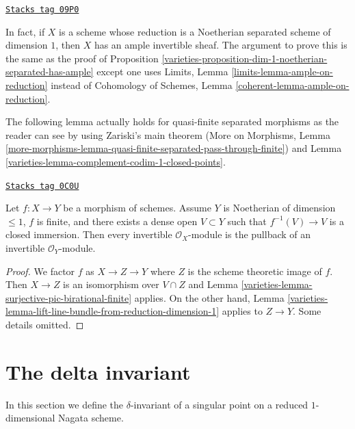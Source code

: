 \begin{remark}
\label{varieties-remark-useless-generalization}
\href{https://stacks.math.columbia.edu/tag/09P0}{\texttt{Stacks tag 09P0}}

In fact, if $X$ is a scheme whose reduction is a Noetherian
separated scheme of dimension $1$, then $X$ has an ample invertible
sheaf. The argument to prove this is the same as the proof of
Proposition \ref{varieties-proposition-dim-1-noetherian-separated-has-ample}
except one uses
Limits, Lemma \ref{limits-lemma-ample-on-reduction}
instead of
Cohomology of Schemes, Lemma \ref{coherent-lemma-ample-on-reduction}.
\end{remark}

The following lemma actually holds for quasi-finite separated morphisms
as the reader can see by using Zariski's main theorem
(More on Morphisms, Lemma
\ref{more-morphisms-lemma-quasi-finite-separated-pass-through-finite})
and Lemma \ref{varieties-lemma-complement-codim-1-closed-points}.

\begin{lemma}
\label{varieties-lemma-surjection-on-pic-quasi-finite}
\href{https://stacks.math.columbia.edu/tag/0C0U}{\texttt{Stacks tag 0C0U}}

Let $f : X \to Y$ be a morphism of schemes. Assume
$Y$ is Noetherian of dimension $\leq 1$, $f$ is finite, and
there exists a dense open $V \subset Y$ such that
$f^{-1}(V) \to V$ is a closed immersion. Then every invertible
$\mathcal{O}_X$-module is the pullback of an invertible $\mathcal{O}_Y$-module.
\end{lemma}

\begin{proof}

We factor $f$ as $X \to Z \to Y$ where $Z$ is the scheme theoretic
image of $f$. Then $X \to Z$ is an isomorphism over $V \cap Z$
and Lemma \ref{varieties-lemma-surjective-pic-birational-finite} applies.
On the other hand,
Lemma \ref{varieties-lemma-lift-line-bundle-from-reduction-dimension-1}
applies to $Z \to Y$. Some details omitted.
\end{proof}

\section{The delta invariant}
\label{varieties-section-delta-invariant}
In this section we define the $\delta$-invariant of a singular point
on a reduced $1$-dimensional Nagata scheme.

